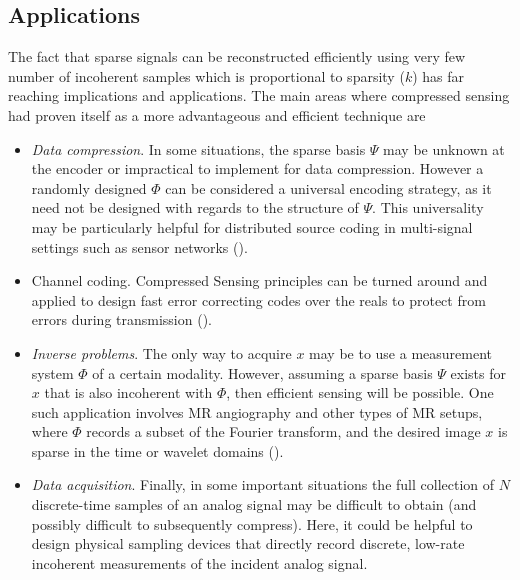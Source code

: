 \subsection{Applications}
\label{s:cs_applications}
The fact that sparse signals can be reconstructed efficiently using very few number of incoherent
samples which is proportional to sparsity ($k$) has far reaching implications and applications. The main 
areas where compressed sensing had proven itself as a more advantageous and efficient technique are
\begin{itemize}
 \item \emph{Data compression}. In some situations, the sparse basis $\Psi$ may be unknown at the encoder or impractical to implement
for data compression. However a randomly designed $\Phi$ can be considered a universal encoding strategy, as it need not be 
designed with regards to the structure of $\Psi$. This universality may be particularly helpful for distributed source
coding in multi-signal settings such as sensor networks (\cite{baron09}).
 \item Channel coding. Compressed Sensing principles can be turned around and applied to design fast error correcting codes over
the reals to protect from errors during transmission (\cite{cand05}).

 \item \emph{Inverse problems}. The only way to acquire $x$ may be to use a measurement system $\Phi$ of a certain
    modality. However, assuming a sparse basis $\Psi$ exists for $x$ that is also incoherent with $\Phi$, then efficient sensing will
    be possible. One such application involves MR angiography and other types of MR setups, where $\Phi$ records a
    subset of the Fourier transform, and the desired image $x$ is sparse in the time or wavelet domains (\cite{lustig06}).

 \item \emph{Data acquisition}. Finally, in some important situations the full collection of $N$ discrete-time samples of an analog signal
may be difficult to obtain (and possibly difficult to subsequently compress). Here, it could be helpful to design physical
sampling devices that directly record discrete, low-rate incoherent measurements of the incident analog signal.

\end{itemize}
